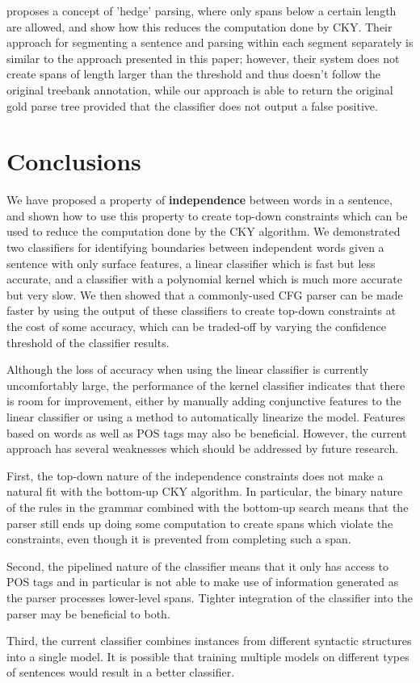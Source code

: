 \documentclass[11pt]{article}
\begin{document}
\cite{Yarmohammadi2014} proposes a concept of 'hedge' parsing, where
only spans below a certain length are allowed, and show how this
reduces the computation done by CKY. Their approach for segmenting a
sentence and parsing within each segment separately is similar to the
approach presented in this paper; however, their system does not create
spans of length larger than the threshold and thus doesn't follow the
original treebank annotation, while our approach is able to return the
original gold parse tree provided that the classifier does not output
a false positive.

\section{Conclusions}
\label{sec-7}

We have proposed a property of \textbf{independence} between words in a
sentence, and shown how to use this property to create top-down
constraints which can be used to reduce the computation done by the
CKY algorithm. We demonstrated two classifiers for identifying
boundaries between independent words given a sentence with only
surface features, a linear classifier which is fast but less accurate,
and a classifier with a polynomial kernel which is much more accurate
but very slow. We then showed that a commonly-used CFG parser can be
made faster by using the output of these classifiers to create
top-down constraints at the cost of some accuracy, which can be
traded-off by varying the confidence threshold of the classifier
results.

Although the loss of accuracy when using the linear classifier is
currently uncomfortably large, the performance of the kernel
classifier indicates that there is room for improvement, either by
manually adding conjunctive features to the linear classifier or using
a method to automatically linearize the model. Features based on words
as well as POS tags may also be beneficial. However, the current
approach has several weaknesses which should be addressed by future
research.

First, the top-down nature of the independence constraints does not
make a natural fit with the bottom-up CKY algorithm. In particular,
the binary nature of the rules in the grammar combined with the
bottom-up search means that the parser still ends up doing some
computation to create spans which violate the constraints, even though
it is prevented from completing such a span.

Second, the pipelined nature of the classifier means that it only has
access to POS tags and in particular is not able to make use of
information generated as the parser processes lower-level spans.
Tighter integration of the classifier into the parser may be
beneficial to both.

Third, the current classifier combines instances from different
syntactic structures into a single model. It is possible that training
multiple models on different types of sentences would result in a
better classifier.



\end{document}
